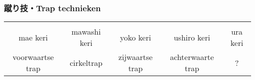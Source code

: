 \subsubsection{蹴り技・Trap technieken}
\begin{table}[H]
\begin{center}
\begin{tabular}{c|c|c|c|c}
    \ruby{}{} & \ruby{}{} & \ruby{}{} & \ruby{}{} & \ruby{}{}\\
    mae keri & mawashi keri & yoko keri & ushiro keri & ura keri\\
    voorwaartse trap & cirkeltrap & zijwaartse trap & achterwaarte trap & ? 
\end{tabular}
\end{center}
\label{dan_1_keriwaza}
\end{table}

